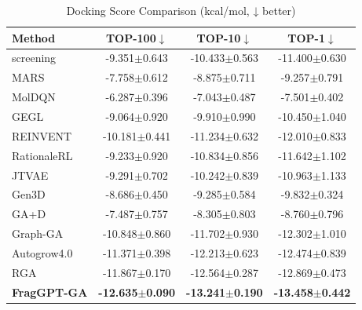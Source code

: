 \documentclass[lettersize,journal]{IEEEtran}
\begin{document}
\begin{table}[!t]
    \caption{Docking Score Comparison (kcal/mol, ↓ better)}
    \label{tab:docking_scores}
    \centering    
    \small
    \setlength{\tabcolsep}{4pt}
    
    \begin{tabular}{l c c c}
        \hline\hline
        Method & TOP-100$\downarrow$ & TOP-10$\downarrow$ & TOP-1$\downarrow$ \\
        \hline
        screening\cite{graff2021accelerating} & -9.351$\pm$0.643 & -10.433$\pm$0.563 & -11.400$\pm$0.630 \\
        MARS\cite{xie2021marsmarkovmolecularsampling} & -7.758$\pm$0.612 & -8.875$\pm$0.711 & -9.257$\pm$0.791 \\
        MolDQN\cite{zhou2019optimization} & -6.287$\pm$0.396 & -7.043$\pm$0.487 & -7.501$\pm$0.402 \\
        GEGL\cite{ahnGuidingDeepMolecular2020} & -9.064$\pm$0.920 & -9.910$\pm$0.990 & -10.450$\pm$1.040 \\
        REINVENT\cite{olivecronaMolecularDeNovoDesign2017} & -10.181$\pm$0.441 & -11.234$\pm$0.632 & -12.010$\pm$0.833 \\
        RationaleRL\cite{jinMultiObjectiveMoleculeGeneration2020} & -9.233$\pm$0.920 & -10.834$\pm$0.856 & -11.642$\pm$1.102 \\
        JTVAE\cite{jinJunctionTreeVariational2018} & -9.291$\pm$0.702 & -10.242$\pm$0.839 & -10.963$\pm$1.133 \\
        Gen3D\cite{luoGraph2022} & -8.686$\pm$0.450 & -9.285$\pm$0.584 & -9.832$\pm$0.324 \\
        GA+D\cite{nigamAugmentingGeneticAlgorithms2020} & -7.487$\pm$0.757 & -8.305$\pm$0.803 & -8.760$\pm$0.796 \\
        Graph-GA\cite{jensenGraphBasedGeneticAlgorithm2019} & -10.848$\pm$0.860 & -11.702$\pm$0.930 & -12.302$\pm$1.010 \\
        Autogrow4.0\cite{spiegelAutoGrow4OpensourceGenetic2020} & -11.371$\pm$0.398 & -12.213$\pm$0.623 & -12.474$\pm$0.839 \\
        RGA\cite{fuReinforcedGeneticAlgorithm}  & -11.867$\pm$0.170 & -12.564$\pm$0.287 & -12.869$\pm$0.473 \\             
        \hline
        \textbf{FragGPT-GA} & \textbf{-12.635$\pm$0.090} & \textbf{-13.241$\pm$0.190} & \textbf{-13.458$\pm$0.442} \\           
        \hline\hline
    \end{tabular}
\end{table}
\end{document}
